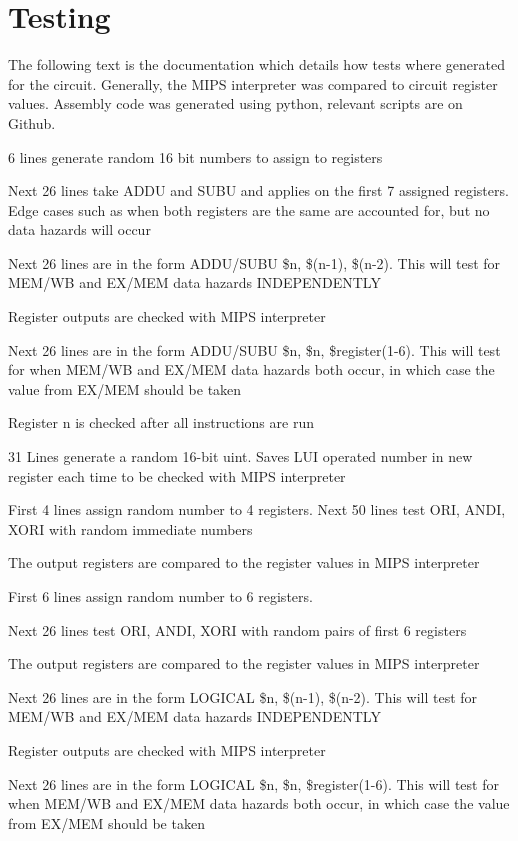 \documentclass[10pt]{article}
\begin{document}
\section{Testing}
The following text is the documentation which details how tests where generated for the circuit. Generally, the MIPS interpreter was compared to circuit register values. Assembly code was generated using python, relevant scripts are on Github.

 6 lines generate random 16 bit numbers to assign to registers
 
 Next 26 lines take ADDU and SUBU and applies on the first 7 assigned registers. Edge cases such as when both registers are the same are accounted for, but no data hazards will occur
 
 Next 26 lines are in the form ADDU/SUBU \$n, \$(n-1), \$(n-2). This will test for MEM/WB and EX/MEM data hazards INDEPENDENTLY
 
 Register outputs are checked with MIPS interpreter
 
 Next 26 lines are in the form ADDU/SUBU \$n, \$n, \$register(1-6). This will test for when MEM/WB and EX/MEM data hazards both occur, in which case the value from EX/MEM should be taken
 
 Register n is checked after all instructions are run

 31 Lines generate a random 16-bit uint. Saves LUI operated number in new register each time to be checked with MIPS interpreter

 First 4 lines assign random number to 4 registers. Next 50 lines test ORI, ANDI, XORI with random immediate numbers
 
 The output registers are compared to the register values in MIPS interpreter

 First 6 lines assign random number to 6 registers. 
 
 Next 26 lines test ORI, ANDI, XORI with random pairs of first 6 registers
 
 The output registers are compared to the register values in MIPS interpreter
 
 Next 26 lines are in the form LOGICAL \$n, \$(n-1), \$(n-2). This will test for MEM/WB and EX/MEM data hazards INDEPENDENTLY
 
 Register outputs are checked with MIPS interpreter
 
 Next 26 lines are in the form LOGICAL \$n, \$n, \$register(1-6). This will test for when MEM/WB and EX/MEM data hazards both occur, in which case the value from EX/MEM should be taken
 
\end{document}
